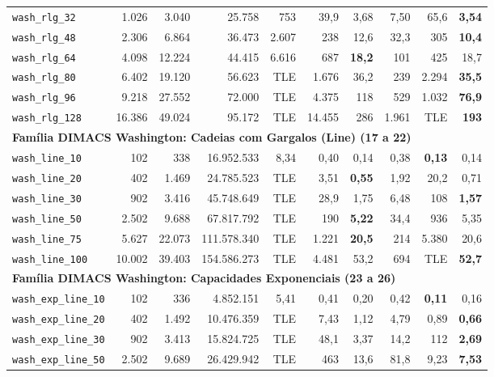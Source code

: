 \begin{longtable}{lrrrrrrrrr}
\texttt{wash\_rlg\_32} & 1.026 & 3.040 & 25.758 & 753 & 39,9 & 3,68 & 7,50 & 65,6 & \textbf{3,54} \\
\texttt{wash\_rlg\_48} & 2.306 & 6.864 & 36.473 & 2.607 & 238 & 12,6 & 32,3 & 305 & \textbf{10,4} \\
\texttt{wash\_rlg\_64} & 4.098 & 12.224 & 44.415 & 6.616 & 687 & \textbf{18,2} & 101 & 425 & 18,7 \\
\texttt{wash\_rlg\_80} & 6.402 & 19.120 & 56.623 & TLE & 1.676 & 36,2 & 239 & 2.294 & \textbf{35,5} \\
\texttt{wash\_rlg\_96} & 9.218 & 27.552 & 72.000 & TLE & 4.375 & 118 & 529 & 1.032 & \textbf{76,9} \\
\texttt{wash\_rlg\_128} & 16.386 & 49.024 & 95.172 & TLE & 14.455 & 286 & 1.961 & TLE & \textbf{193} \\
\midrule
\multicolumn{10}{l}{\textbf{Família DIMACS Washington: Cadeias com Gargalos (Line) (17 a 22)}} \\
\midrule
\texttt{wash\_line\_10} & 102 & 338 & 16.952.533 & 8,34 & 0,40 & 0,14 & 0,38 & \textbf{0,13} & 0,14 \\
\texttt{wash\_line\_20} & 402 & 1.469 & 24.785.523 & TLE & 3,51 & \textbf{0,55} & 1,92 & 20,2 & 0,71 \\
\texttt{wash\_line\_30} & 902 & 3.416 & 45.748.649 & TLE & 28,9 & 1,75 & 6,48 & 108 & \textbf{1,57} \\
\texttt{wash\_line\_50} & 2.502 & 9.688 & 67.817.792 & TLE & 190 & \textbf{5,22} & 34,4 & 936 & 5,35 \\
\texttt{wash\_line\_75} & 5.627 & 22.073 & 111.578.340 & TLE & 1.221 & \textbf{20,5} & 214 & 5.380 & 20,6 \\
\texttt{wash\_line\_100} & 10.002 & 39.403 & 154.586.273 & TLE & 4.481 & 53,2 & 694 & TLE & \textbf{52,7} \\
\midrule
\multicolumn{10}{l}{\textbf{Família DIMACS Washington: Capacidades Exponenciais (23 a 26)}} \\
\midrule
\texttt{wash\_exp\_line\_10} & 102 & 336 & 4.852.151 & 5,41 & 0,41 & 0,20 & 0,42 & \textbf{0,11} & 0,16 \\
\texttt{wash\_exp\_line\_20} & 402 & 1.492 & 10.476.359 & TLE & 7,43 & 1,12 & 4,79 & 0,89 & \textbf{0,66} \\
\texttt{wash\_exp\_line\_30} & 902 & 3.413 & 15.824.725 & TLE & 48,1 & 3,37 & 14,2 & 112 & \textbf{2,69} \\
\texttt{wash\_exp\_line\_50} & 2.502 & 9.689 & 26.429.942 & TLE & 463 & 13,6 & 81,8 & 9,23 & \textbf{7,53} \\

\end{longtable}
